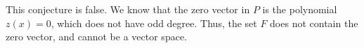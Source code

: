 This conjecture is false.  We know that the zero vector in $P$ is the polynomial $z(x) = 0$, which does not have odd degree.  Thus, the set $F$ does not contain the zero vector, and cannot be a vector space.
